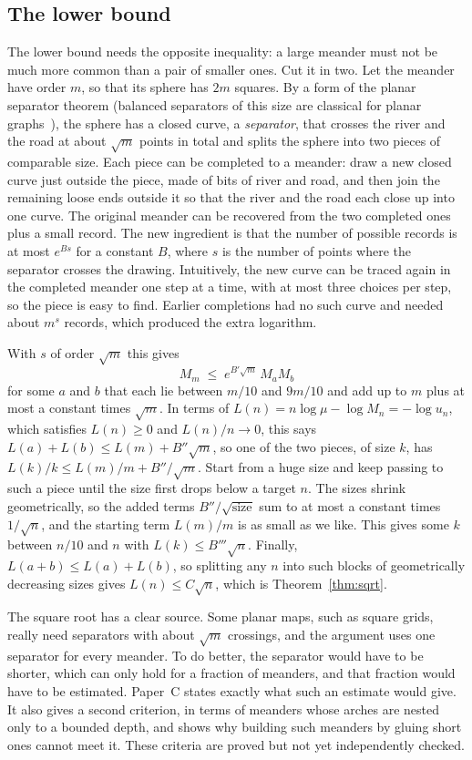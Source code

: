 \subsection{The lower bound}

The lower bound needs the opposite inequality: a large meander must not be much more common than
a pair of smaller ones. Cut it in two. Let the meander have order $m$, so that its sphere has
$2m$ squares. By a form of the planar separator theorem (balanced separators of this size are
classical for planar graphs~\cite{LT,Miller}), the sphere has a closed curve, a
\emph{separator}, that crosses the river and the road at about $\sqrt m$ points in total and
splits the sphere into two pieces of comparable size. Each piece can be completed to a meander:
draw a new closed curve just outside the piece, made of bits of river and road, and then join the
remaining loose ends outside it so that the river and the road each close up into one curve. The
original meander can be recovered from the two completed ones plus a small record. The new
ingredient is that the number of possible records is at most $e^{Bs}$ for a constant $B$, where
$s$ is the number of points where the separator crosses the drawing. Intuitively, the new curve
can be traced again in the completed meander one step at a time, with at most three choices per
step, so the piece is easy to find. Earlier completions had no such curve and needed about
$m^{s}$ records, which produced the extra logarithm.

With $s$ of order $\sqrt m$ this gives
\[ M_m \;\le\; e^{B'\sqrt m}\, M_a M_b \]
for some $a$ and $b$ that each lie between $m/10$ and $9m/10$ and add up to $m$ plus at most a
constant times $\sqrt m$. In terms of $L(n)=n\log\mu-\log M_n=-\log u_n$, which satisfies
$L(n)\ge0$ and $L(n)/n\to0$, this says $L(a)+L(b)\le L(m)+B''\sqrt m$, so one of the two pieces, of size $k$, has
$L(k)/k\le L(m)/m+B''/\sqrt m$. Start from a huge size and keep passing to such a piece until the
size first drops below a target $n$. The sizes shrink geometrically, so the added terms
$B''/\sqrt{\text{size}}$ sum to at most a constant times $1/\sqrt n$, and the starting term
$L(m)/m$ is as small as we like. This gives some $k$ between $n/10$ and $n$ with
$L(k)\le B'''\sqrt n$. Finally, $L(a+b)\le L(a)+L(b)$, so splitting any $n$ into such blocks of
geometrically decreasing sizes gives $L(n)\le C\sqrt n$, which is Theorem~\ref{thm:sqrt}.

The square root has a clear source. Some planar maps, such as square grids, really need
separators with about $\sqrt m$ crossings, and the argument uses one separator for every meander.
To do better, the separator would have to be shorter, which can only hold for a fraction of
meanders, and that fraction would have to be estimated. Paper~C states exactly what such an
estimate would give. It also gives a second criterion, in terms of meanders whose arches are
nested only to a bounded depth, and shows why building such meanders by gluing short ones cannot
meet it. These criteria are proved but not yet independently checked.

